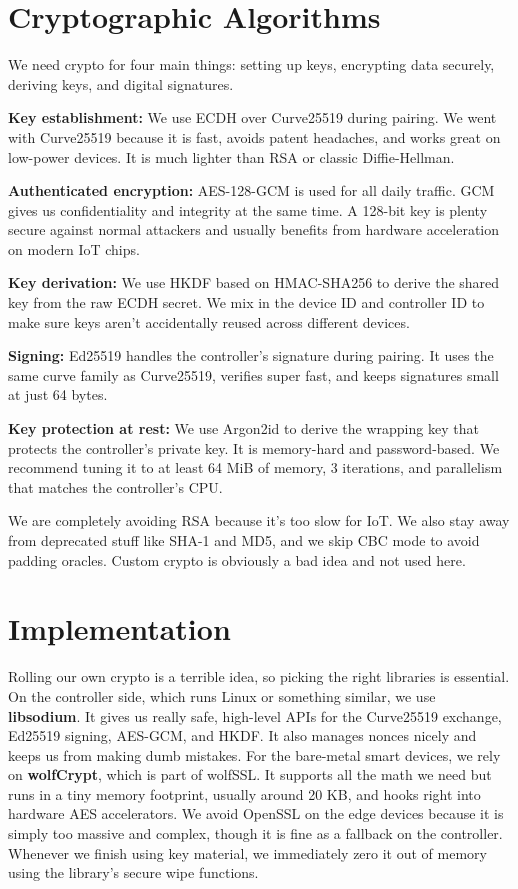 \documentclass[a4paper,11pt]{article}
\begin{document}
\section{Cryptographic Algorithms}\label{sec:algorithms}

We need crypto for four main things: setting up keys, encrypting data securely, deriving keys, and digital signatures.

\textbf{Key establishment:} We use ECDH over Curve25519 during pairing. We went with Curve25519 because it is fast, avoids patent headaches, and works great on low-power devices. It is much lighter than RSA or classic Diffie-Hellman.

\textbf{Authenticated encryption:} AES-128-GCM is used for all daily traffic. GCM gives us confidentiality and integrity at the same time. A 128-bit key is plenty secure against normal attackers and usually benefits from hardware acceleration on modern IoT chips.

\textbf{Key derivation:} We use HKDF based on HMAC-SHA256 to derive the shared key from the raw ECDH secret. We mix in the device ID and controller ID to make sure keys aren't accidentally reused across different devices.

\textbf{Signing:} Ed25519 handles the controller's signature during pairing. It uses the same curve family as Curve25519, verifies super fast, and keeps signatures small at just 64 bytes.

\textbf{Key protection at rest:} We use Argon2id to derive the wrapping key that protects the controller's private key. It is memory-hard and password-based. We recommend tuning it to at least 64 MiB of memory, 3 iterations, and parallelism that matches the controller's CPU.

We are completely avoiding RSA because it's too slow for IoT. We also stay away from deprecated stuff like SHA-1 and MD5, and we skip CBC mode to avoid padding oracles. Custom crypto is obviously a bad idea and not used here.

\section{Implementation}

Rolling our own crypto is a terrible idea, so picking the right libraries is essential. On the controller side, which runs Linux or something similar, we use \textbf{libsodium}. It gives us really safe, high-level APIs for the Curve25519 exchange, Ed25519 signing, AES-GCM, and HKDF. It also manages nonces nicely and keeps us from making dumb mistakes. For the bare-metal smart devices, we rely on \textbf{wolfCrypt}, which is part of wolfSSL. It supports all the math we need but runs in a tiny memory footprint, usually around 20 KB, and hooks right into hardware AES accelerators. We avoid OpenSSL on the edge devices because it is simply too massive and complex, though it is fine as a fallback on the controller. Whenever we finish using key material, we immediately zero it out of memory using the library's secure wipe functions.
\end{document}

